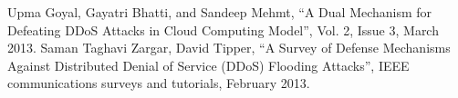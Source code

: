 \documentclass[letterpaper, 10 pt, conference]{ieeeconf}  %
\begin{document}
\begin{thebibliography}{99}
 Upma Goyal, Gayatri Bhatti, and Sandeep Mehmt, “A Dual Mechanism for Defeating DDoS Attacks in Cloud Computing Model”, Vol. 2, Issue 3, March 2013.
 Saman Taghavi Zargar, David Tipper, “A Survey of Defense Mechanisms Against Distributed Denial of Service (DDoS) Flooding Attacks”, IEEE communications surveys and tutorials, February 2013.





\end{thebibliography}
\end{document}
